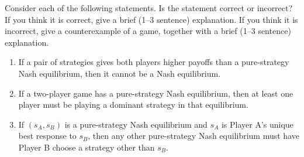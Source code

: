 \documentclass{assignment}
\begin{document}
\begin{problem}
    Consider each of the following statements. Is the statement correct or
    incorrect? If you think it is correct, give a brief (1--3 sentence) explanation.
    If you think it is incorrect, give a counterexample of a game, together with a
    brief (1--3 sentence) explanation.

    \begin{enumerate}
        \item[(a)] If a pair of strategies gives both players higher payoffs than a
              pure-strategy Nash equilibrium, then it cannot be a Nash equilibrium.
        \item[(b)] If a two-player game has a pure-strategy Nash equilibrium, then at
              least one player must be playing a dominant strategy in that equilibrium.
        \item[(c)] If \((s_A, s_B)\) is a pure-strategy Nash equilibrium and \(s_A\)
              is Player A's unique best response to \(s_B\), then any other
              pure-strategy Nash equilibrium must have Player B choose a strategy other
              than \(s_B\).
    \end{enumerate}
\end{problem}
\end{document}
